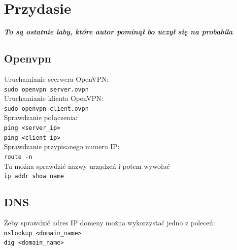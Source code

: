 \documentclass[]{article}
\begin{document}
\section{Przydasie}
\textbf{\emph{To są ostatnie laby, które autor pominął bo uczył się na probabila}}\\
\subsection{Openvpn}
\noindent
Uruchamianie seerwera OpenVPN: \\
\texttt{sudo openvpn server.ovpn} \\
Uruchamianie klienta OpenVPN: \\
\texttt{sudo openvpn client.ovpn} \\
Sprawdzanie połączenia: \\
\texttt{ping <server\_ip>} \\
\texttt{ping <client\_ip>} \\
Sprawdzanie przypisanego numeru IP: \\
\texttt{route -n} \\
Tu można sprawdzić nazwy urządzeń i potem wywołać \\
\texttt{ip addr show name}
\subsection{DNS}
\noindent
Żeby sprawdzić adres IP domeny można wykorzystać jedno z poleceń: \\
\texttt{nslookup <domain\_name>} \\
\texttt{dig <domain\_name>} \\
\end{document}

